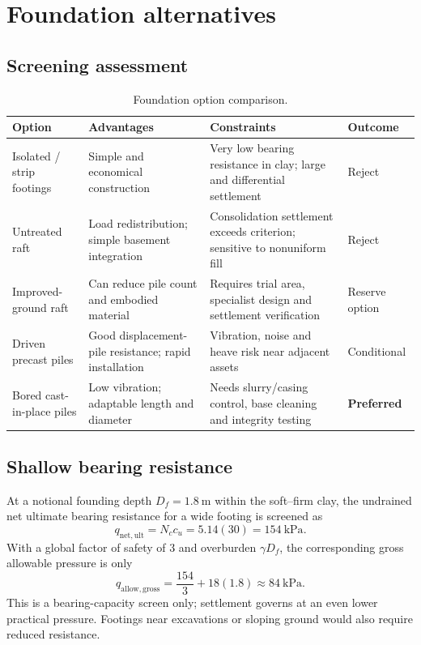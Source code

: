 \section{Foundation alternatives}
\subsection{Screening assessment}
\begin{table}[H]
\centering
\caption{Foundation option comparison.}
\label{tab:options}
\begin{tabularx}{\textwidth}{@{}L{34mm}Y Y C{22mm}@{}}
\toprule
{}
\textbf{Option} & \textbf{Advantages} & \textbf{Constraints} & \textbf{Outcome} \\
\midrule
Isolated / strip footings & Simple and economical construction & Very low bearing resistance in clay; large and differential settlement & Reject \\
Untreated raft & Load redistribution; simple basement integration & Consolidation settlement exceeds criterion; sensitive to nonuniform fill & Reject \\
Improved-ground raft & Can reduce pile count and embodied material & Requires trial area, specialist design and settlement verification & Reserve option \\
Driven precast piles & Good displacement-pile resistance; rapid installation & Vibration, noise and heave risk near adjacent assets & Conditional \\
Bored cast-in-place piles & Low vibration; adaptable length and diameter & Needs slurry/casing control, base cleaning and integrity testing & \textbf{Preferred} \\
\bottomrule
\end{tabularx}
\end{table}

\subsection{Shallow bearing resistance}
At a notional founding depth $D_f=\SI{1.8}{\metre}$ within the soft--firm clay, the undrained
net ultimate bearing resistance for a wide footing is screened as
\begin{equation}
q_{\mathrm{net,ult}} = N_c c_u = 5.14(30) = \SI{154}{\kilo\pascal}.
\end{equation}
With a global factor of safety of 3 and overburden $\gamma D_f$, the corresponding gross
allowable pressure is only
\begin{equation}
q_{\mathrm{allow,gross}}
=\frac{154}{3}+18(1.8) \approx \SI{84}{\kilo\pascal}.
\end{equation}
This is a bearing-capacity screen only; settlement governs at an even lower practical pressure.
Footings near excavations or sloping ground would also require reduced resistance.

